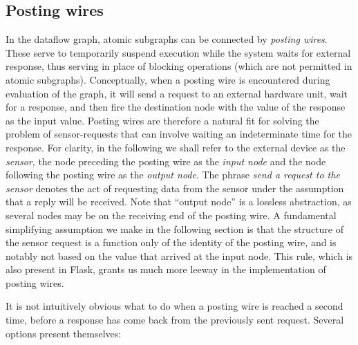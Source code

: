 \documentclass[a4paper, oneside, final]{memoir}
\begin{document}
\subsection{Posting wires}
\label{sec:posting wires}
In the dataflow graph, atomic subgraphs can be connected by
\textit{posting wires}.  These serve to temporarily suspend execution
while the system waits for external response, thus serving in place of
blocking operations (which are not permitted in atomic subgraphs).
Conceptually, when a posting wire is encountered during evaluation of
the graph, it will send a request to an external hardware unit, wait
for a response, and then fire the destination node with the value of
the response as the input value.  Posting wires are therefore a
natural fit for solving the problem of sensor-requests that can
involve waiting an indeterminate time for the response.  For clarity,
in the following we shall refer to the external device as the
\textit{sensor}, the node preceding the posting wire as the
\textit{input node} and the node following the posting wire as the
\textit{output node}.  The phrase \textit{send a request to the
  sensor} denotes the act of requesting data from the sensor under the
assumption that a reply will be received.  Note that ``output node''
is a lossless abstraction, as several nodes may be on the receiving
end of the posting wire.  A fundamental simplifying assumption we make
in the following section is that the structure of the sensor request
is a function only of the identity of the posting wire, and is notably
not based on the value that arrived at the input node.  This rule,
which is also present in Flask, grants us much more leeway in the
implementation of posting wires.

It is not intuitively obvious what to do when a posting wire is
reached a second time, before a response has come back from the
previously sent request.  Several options present themselves:
\end{document}
